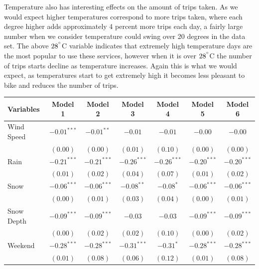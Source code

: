 \documentclass[12pt,letter paper]{article}
\begin{document}
Temperature also has interesting effects on the amount of trips taken.  As we would expect higher temperatures correspond to more trips taken, where  each degree higher adds approximately 4 percent more trips each day, a fairly large number when we consider temperature could swing over 20 degrees in the data set.  The above $28^{\degree}$C variable indicates that extremely high temperature days are the most popular to use these services, however when it is over $28^{\degree}$C the number of trips starts decline as temperature increases.  Again this is what we would expect, as temperatures start to get extremely high it becomes less pleasant to bike and reduces the number of trips.
\bgroup
\def\arraystretch{0.5}
\begin{table}[H]
\begin{center}
\begin{tabular}{l c c c c c c }
\hline
 Variables & Model 1 & Model 2 & Model 3 & Model 4 & Model 5 & Model 6 \\
\hline
Wind Speed              & $-0.01^{***}$ & $-0.01^{**}$  & $-0.01$       & $-0.01$       & $-0.00$       & $-0.00$       \\
                        & $(0.00)$      & $(0.00)$      & $(0.01)$      & $(0.10)$      & $(0.00)$      & $(0.00)$      \\
Rain                    & $-0.21^{***}$ & $-0.21^{***}$ & $-0.26^{***}$ & $-0.26^{***}$ & $-0.20^{***}$ & $-0.20^{***}$ \\
                        & $(0.01)$      & $(0.02)$      & $(0.04)$      & $(0.07)$      & $(0.01)$      & $(0.02)$      \\
Snow                    & $-0.06^{***}$ & $-0.06^{***}$ & $-0.08^{**}$  & $-0.08^{*}$   & $-0.06^{***}$ & $-0.06^{***}$ \\
                        & $(0.00)$      & $(0.01)$      & $(0.03)$      & $(0.04)$      & $(0.00)$      & $(0.01)$      \\
Snow Depth              & $-0.09^{***}$ & $-0.09^{***}$ & $-0.03$       & $-0.03$       & $-0.09^{***}$ & $-0.09^{***}$ \\
                        & $(0.00)$      & $(0.02)$      & $(0.02)$      & $(0.10)$      & $(0.00)$      & $(0.02)$      \\
Weekend                 & $-0.28^{***}$ & $-0.28^{***}$ & $-0.31^{***}$ & $-0.31^{*}$   & $-0.28^{***}$ & $-0.28^{***}$ \\
                        & $(0.01)$      & $(0.08)$      & $(0.06)$      & $(0.12)$      & $(0.01)$      & $(0.08)$      \\

\end{tabular}
\end{center}
\end{table}
\end{document}
